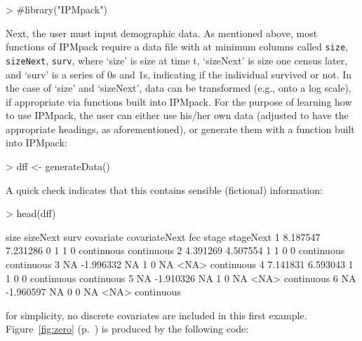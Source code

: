\documentclass{article}
\begin{document}
\begin{Schunk}
\begin{Sinput}
> #library("IPMpack")
\end{Sinput}
\end{Schunk}
Next, the user must input demographic data. As mentioned above, most functions of IPMpack require a data file with at minimum columns called {\tt size}, {\tt sizeNext}, {\tt surv}, where `size' is size at time t, `sizeNext' is size one census later, and `surv' is a series of 0s and 1s, indicating if the individual survived or not. In the case of `size' and `sizeNext', data can be transformed (e.g., onto a log scale), if appropriate via functions built into IPMpack. For the purpose of learning how to use IPMpack, the user can either use his/her own data (adjusted to have the appropriate headings, as aforementioned), or generate them with a function built into IPMpack:

\begin{Schunk}
\begin{Sinput}
> dff <- generateData()
\end{Sinput}
\end{Schunk}
A quick check indicates that this contains sensible (fictional) information: 
\begin{Schunk}
\begin{Sinput}
> head(dff)
\end{Sinput}
\begin{Soutput}
      size  sizeNext surv covariate covariateNext fec      stage  stageNext
1 8.187547  7.231286    0         1             1   0 continuous continuous
2 4.391269  4.507554    1         1             0   0 continuous continuous
3       NA -1.996332   NA         1             0  NA       <NA> continuous
4 7.141831  6.593043    1         1             0   0 continuous continuous
5       NA -1.910326   NA         1             0  NA       <NA> continuous
6       NA -1.960597   NA         0             0  NA       <NA> continuous
\end{Soutput}
\end{Schunk}

for simplicity, no discrete covariates are included in this first example. Figure~\ref{fig:zero} (p.~\pageref{fig:zero}) is produced by the following code:
\end{document}
